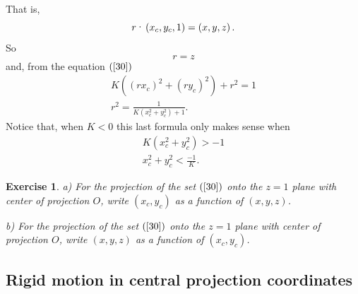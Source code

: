 \documentclass{article}%
\newtheorem{exercise}[theorem]{Exercise}
\begin{document}
That is,%
\begin{equation}
r\text{\textperiodcentered}\left(  x_{c},y_{c},1\right)  =\left(
x,y,z\right)  . \label{131}%
\end{equation}
So%
\[
r=z
\]
and, from the equation $\left(  \ref{30}\right)  $%
\begin{gather*}
K\left(  \left(  rx_{c}\right)  ^{2}+\left(  ry_{c}\right)  ^{2}\right)
+r^{2}=1\\
r^{2}=\frac{1}{K\left(  x_{c}^{2}+y_{c}^{2}\right)  +1}.
\end{gather*}
Notice that, when $K<0$ this last formula only makes sense when%
\begin{gather}
K\left(  x_{c}^{2}+y_{c}^{2}\right)  >-1\label{75}\\
x_{c}^{2}+y_{c}^{2}<\frac{-1}{K}.\nonumber
\end{gather}


\begin{exercise}
\label{31}a) For the projection of the set $\left(  \ref{30}\right)  $ onto
the $z=1$ plane with center of projection $O$, write $\left(  x_{c}%
,y_{c}\right)  $ as a function of $\left(  x,y,z\right)  $.

b) For the projection of the set $\left(  \ref{30}\right)  $ onto the $z=1$
plane with center of projection $O$, write $\left(  x,y,z\right)  $ as a
function of $\left(  x_{c},y_{c}\right)  $.\pagebreak
\end{exercise}

\subsection{Rigid motion in central projection coordinates}
\end{document}
